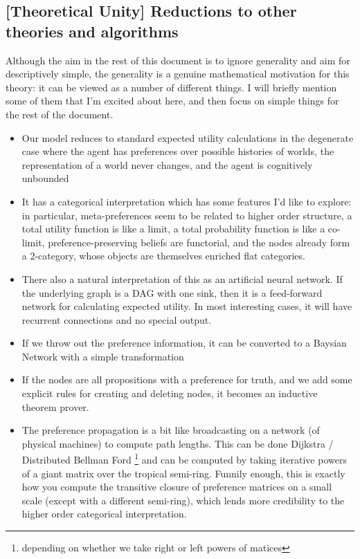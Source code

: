 \documentclass{article}
\begin{document}
	\subsection*{[Theoretical Unity] Reductions to other theories and algorithms}
	Although the aim in the rest of this document is to ignore generality and aim for descriptively simple, the generality is a genuine mathematical motivation for this theory: it can be viewed as a number of different things. I will briefly mention some of them that I'm excited about here, and then focus on simple things for the rest of the document.
	\begin{itemize}[nosep]
		\item Our model reduces to standard expected utility calculations in the degenerate case where the agent has preferences over possible histories of worlds, the representation of a world never changes, and the agent is cognitively unbounded
		\item It has a categorical interpretation which has some features I'd like to explore: in particular, meta-preferences seem to be related to higher order structure, a total utility function is like a limit, a total probability function is like a co-limit, preference-preserving beliefs are functorial, and the nodes already form a 2-category, whose objects are themselves enriched flat categories.
		\item There also a natural interpretation of this as an artificial neural network. If the underlying graph is a DAG with one sink, then it is a feed-forward network for calculating expected utility. In most interesting cases, it will have recurrent connections and no special output.
		\item If we throw out the preference information, it can be converted to a Baysian Network with a simple transformation
		\item If the nodes are all propositions with a preference for truth, and we add some explicit rules for creating and deleting nodes, it becomes an inductive theorem prover.
		\item The preference propagation is a bit like broadcasting on a network (of physical machines) to compute path lengths. This can be done Dijkstra / Distributed Bellman Ford \footnote{depending on whether we take right or left powers of matices} and can be computed by taking iterative powers of a giant matrix over the tropical semi-ring. Funnily enough, this is exactly how you compute the transitive closure of preference matrices on a small scale (except with a different semi-ring), which lends more credibility to the higher order categorical interpretation.
	\end{itemize}
\end{document}
